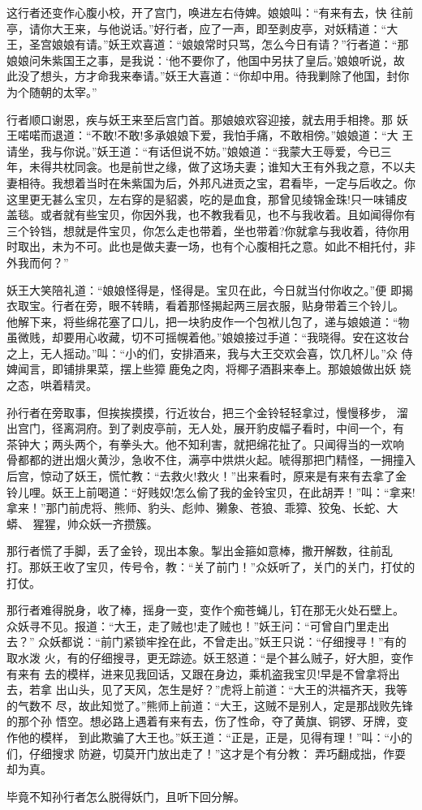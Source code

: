 这行者还变作心腹小校，开了宫门，唤进左右侍婢。娘娘叫：“有来有去，快
往前亭，请你大王来，与他说话。”好行者，应了一声，即至剥皮亭，对妖精道：“大
王，圣宫娘娘有请。”妖王欢喜道：“娘娘常时只骂，怎么今日有请？”行者道：“那
娘娘问朱紫国王之事，是我说：‘他不要你了，他国中另扶了皇后。’娘娘听说，故
此没了想头，方才命我来奉请。”妖王大喜道：“你却中用。待我剿除了他国，封你
为个随朝的太宰。”

行者顺口谢恩，疾与妖王来至后宫门首。那娘娘欢容迎接，就去用手相搀。那
妖王喏喏而退道：“不敢!不敢!多承娘娘下爱，我怕手痛，不敢相傍。”娘娘道：“大
王请坐，我与你说。”妖王道：“有话但说不妨。”娘娘道：“我蒙大王辱爱，今已三
年，未得共枕同衾。也是前世之缘，做了这场夫妻；谁知大王有外我之意，不以夫
妻相待。我想着当时在朱紫国为后，外邦凡进贡之宝，君看毕，一定与后收之。你
这里更无甚么宝贝，左右穿的是貂裘，吃的是血食，那曾见绫锦金珠!只一味铺皮
盖毯。或者就有些宝贝，你因外我，也不教我看见，也不与我收着。且如闻得你有
三个铃铛，想就是件宝贝，你怎么走也带着，坐也带着?你就拿与我收着，待你用
时取出，未为不可。此也是做夫妻一场，也有个心腹相托之意。如此不相托付，非
外我而何？”

妖王大笑陪礼道：“娘娘怪得是，怪得是。宝贝在此，今日就当付你收之。”便
即揭衣取宝。行者在旁，眼不转睛，看着那怪揭起两三层衣服，贴身带着三个铃儿。
他解下来，将些绵花塞了口儿，把一块豹皮作一个包袱儿包了，递与娘娘道：“物
虽微贱，却要用心收藏，切不可摇幌着他。”娘娘接过手道：“我晓得。安在这妆台
之上，无人摇动。”叫：“小的们，安排酒来，我与大王交欢会喜，饮几杯儿。”众
侍婢闻言，即铺排果菜，摆上些獐鹿兔之肉，将椰子酒斟来奉上。那娘娘做出妖
娆之态，哄着精灵。

孙行者在旁取事，但挨挨摸摸，行近妆台，把三个金铃轻轻拿过，慢慢移步，
溜出宫门，径离洞府。到了剥皮亭前，无人处，展开豹皮幅子看时，中间一个，有
茶钟大；两头两个，有拳头大。他不知利害，就把绵花扯了。只闻得当的一欢响，
骨都都的迸出烟火黄沙，急收不住，满亭中烘烘火起。唬得那把门精怪，一拥撞入
后宫，惊动了妖王，慌忙教：“去救火!救火！”出来看时，原来是有来有去拿了金
铃儿哩。妖王上前喝道：“好贱奴!怎么偷了我的金铃宝贝，在此胡弄！”叫：“拿来!
拿来！”那门前虎将、熊师、豹头、彪帅、獭象、苍狼、乖獐、狡兔、长蛇、大蟒、
猩猩，帅众妖一齐攒簇。

那行者慌了手脚，丢了金铃，现出本象。掣出金箍如意棒，撒开解数，往前乱
打。那妖王收了宝贝，传号令，教：“关了前门！”众妖听了，关门的关门，打仗的
打仗。

那行者难得脱身，收了棒，摇身一变，变作个痴苍蝇儿，钉在那无火处石壁上。
众妖寻不见。报道：“大王，走了贼也!走了贼也！”妖王问：“可曾自门里走出去？”
众妖都说：“前门紧锁牢拴在此，不曾走出。”妖王只说：“仔细搜寻！”有的取水泼
火，有的仔细搜寻，更无踪迹。妖王怒道：“是个甚么贼子，好大胆，变作有来有
去的模样，进来见我回话，又跟在身边，乘机盗我宝贝!早是不曾拿将出去，若拿
出山头，见了天风，怎生是好？”虎将上前道：“大王的洪福齐天，我等的气数不
尽，故此知觉了。”熊师上前道：“大王，这贼不是别人，定是那战败先锋的那个孙
悟空。想必路上遇着有来有去，伤了性命，夺了黄旗、铜锣、牙牌，变作他的模样，
到此欺骗了大王也。”妖王道：“正是，正是，见得有理！”叫：“小的们，仔细搜求
防避，切莫开门放出走了！”这才是个有分教：
弄巧翻成拙，作耍却为真。

毕竟不知孙行者怎么脱得妖门，且听下回分解。